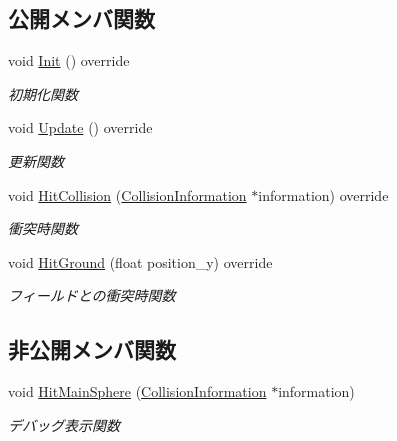 \subsection*{公開メンバ関数}
\begin{DoxyCompactItemize}
\item 
void \mbox{\hyperlink{class_player_collision_a3dd6238b75933fd60aee77e92353cc44}{Init}} () override
\begin{DoxyCompactList}\small\item\em 初期化関数 \end{DoxyCompactList}\item 
void \mbox{\hyperlink{class_player_collision_a09f97f220903f5724a3af6b97af3a336}{Update}} () override
\begin{DoxyCompactList}\small\item\em 更新関数 \end{DoxyCompactList}\item 
void \mbox{\hyperlink{class_player_collision_aed2775b2a14b6868160d6668ed928f8d}{Hit\+Collision}} (\mbox{\hyperlink{class_collision_information}{Collision\+Information}} $\ast$information) override
\begin{DoxyCompactList}\small\item\em 衝突時関数 \end{DoxyCompactList}\item 
void \mbox{\hyperlink{class_player_collision_a3522ce17b1e1752f2737c2243582ecb0}{Hit\+Ground}} (float position\+\_\+y) override
\begin{DoxyCompactList}\small\item\em フィールドとの衝突時関数 \end{DoxyCompactList}\end{DoxyCompactItemize}
\subsection*{非公開メンバ関数}
\begin{DoxyCompactItemize}
\item 
void \mbox{\hyperlink{class_player_collision_a28cb5a10d40f5e1c39845f88cee52184}{Hit\+Main\+Sphere}} (\mbox{\hyperlink{class_collision_information}{Collision\+Information}} $\ast$information)
\begin{DoxyCompactList}\small\item\em デバッグ表示関数 \end{DoxyCompactList}\end{DoxyCompactItemize}
